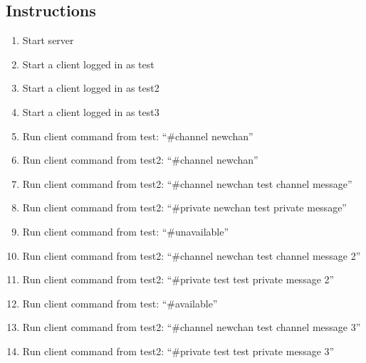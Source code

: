 \documentclass[12pt]{article}
\begin{document}
\subsection*{Instructions}
\begin{enumerate}
\item Start server
\item Start a client logged in as test
\item Start a client logged in as test2
\item Start a client logged in as test3
\item Run client command from test: ``\#channel newchan''
\item Run client command from test2: ``\#channel newchan''
\item Run client command from test2: ``\#channel newchan test channel message''
\item Run client command from test2: ``\#private newchan test private message''
\item Run client command from test: ``\#unavailable''
\item Run client command from test2: ``\#channel newchan test channel message 2''
\item Run client command from test2: ``\#private test test private message 2''
\item Run client command from test: ``\#available''
\item Run client command from test2: ``\#channel newchan test channel message 3''
\item Run client command from test2: ``\#private test test private message 3''
\end{enumerate}
\end{document}
